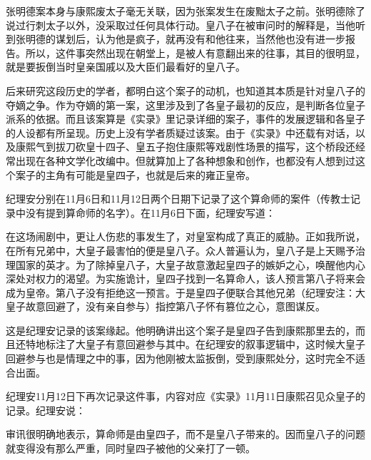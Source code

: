 
张明德案本身与康熙废太子毫无关联，因为张案发生在废黜太子之前。张明德除了说过行刺太子以外，没采取过任何具体行动。皇八子在被审问时的解释是，当他听到张明德的谋划后，认为他是疯子，就再没有和他往来，当然他也没有进一步报告。所以，这件事突然出现在朝堂上，是被人有意翻出来的往事，其目的很明显，就是要扳倒当时皇亲国戚以及大臣们最看好的皇八子。



后来研究这段历史的学者，都明白这个案子的动机，也知道其本质是针对皇八子的夺嫡之争。作为夺嫡的第一案，这里涉及到了各皇子最初的反应，是判断各位皇子派系的依据。而且该案算是《实录》里记录详细的案子，事件的发展逻辑和各皇子的人设都有所呈现。历史上没有学者质疑过该案。由于《实录》中还载有对话，以及康熙气到拔刀砍皇十四子、皇五子抱住康熙等戏剧性场景的描写，这个桥段还经常出现在各种文学化改编中。但就算加上了各种想象和创作，也都没有人想到过这个案子的主角有可能是皇四子，也就是后来的雍正皇帝。



纪理安分别在11月6日和11月12日两个日期下记录了这个算命师的案件（传教士记录中没有提到算命师的名字）。在11月6日下面，纪理安写道：



\begin{bookquote}在这场闹剧中，更让人伤悲的事发生了，对皇室构成了真正的威胁。正如我所说，在所有兄弟中，大皇子最害怕的便是皇八子。众人普遍认为，皇八子是上天赐予治理国家的英才。为了除掉皇八子，大皇子故意激起皇四子的嫉妒之心，唤醒他内心深处对权力的渴望。为实施诡计，皇四子找到一名算命人，该人预言第八子将来会成为皇帝。第八子没有拒绝这一预言。于是皇四子便联合其他兄弟（纪理安注：大皇子故意回避了，没有亲自参与）指控第八子怀有篡位之心，意图谋反。\end{bookquote}


这是纪理安记录的该案缘起。他明确讲出这个案子是皇四子告到康熙那里去的，而且还特地标注了大皇子有意回避参与其中。在纪理安的叙事逻辑中，这时候大皇子回避参与也是情理之中的事，因为他刚被太监扳倒，受到康熙处分，这时完全不适合出面。



纪理安11月12日下再次记录这件事，内容对应《实录》11月11日康熙召见众皇子的记录。纪理安说：



\begin{bookquote}审讯很明确地表示，算命师是由皇四子，而不是皇八子带来的。因而皇八子的问题就变得没有那么严重，同时皇四子被他的父亲打了一顿。\end{bookquote}

